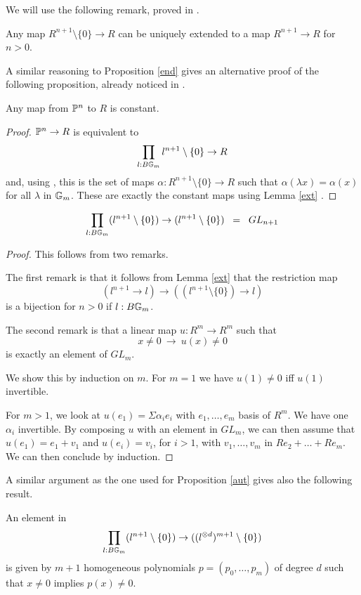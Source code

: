 We will use the following remark, proved in \cite{draft}.

\begin{lemma}\label{ext}
  Any map $R^{n+1}\setminus\{0\}\rightarrow R$ can be uniquely extended to a map $R^{n+1}\rightarrow R$ for $n>0$.
\end{lemma}

A similar reasoning to Proposition \ref{end} gives an alternative proof of the following proposition, already noticed in \cite{draft}.

\begin{proposition}\label{const}
 Any map from $\mathbb{P}^n$ to $R$ is constant.
\end{proposition}

\begin{proof}
  $\mathbb{P}^n\rightarrow R$ is equivalent to
  $$\prod_{l:B\mathbb{G}_m}l^{n+1}\setminus\{0\}\rightarrow R$$
  and, using \cite{Sym}, this is the set of maps $\alpha:R^{n+1}\setminus\{0\}\rightarrow R$
  such that $\alpha(\lambda x) = \alpha(x)$ for all $\lambda$ in $\mathbb{G}_m$. These are exactly the constant maps
  using Lemma \ref{ext} \cite{draft}.
\end{proof}

\begin{proposition}\label{aut}
$$\prod_{l:B\mathbb{G}_m}(l^{n+1}\setminus\{0\})\rightarrow (l^{n+1}\setminus\{0\}) \;\;=\;\; GL_{n+1}$$
\end{proposition}

\begin{proof}
  This follows from two remarks.

  The first remark is that it follows from Lemma \ref{ext} that the restriction map
$$
(l^{n+1}\rightarrow l)\rightarrow ((l^{n+1}\setminus\{0\})\rightarrow l)
$$
is a bijection for $n>0$ if $l:B\mathbb{G}_m$.

\medskip

The second remark is that a linear map $u:R^{m}\rightarrow R^{m}$ such that
$$
x\neq 0~\rightarrow~u(x)\neq 0
$$
is exactly an element of $GL_{m}$.

We show this by induction on $m$. For $m=1$ we have $u(1)\neq 0$ iff $u(1)$ invertible.

For $m>1$, we look at $u(e_1) = \Sigma \alpha_ie_i$ with $e_1,\dots,e_m$ basis of $R^m$.
We have one $\alpha_i$ invertible. By composing $u$ with an element in $GL_m$, we can then
assume that $u(e_1) = e_1+v_1$ and $u(e_i) = v_i$, for $i>1$, with $v_1,\dots,v_m$ in $Re_2+\dots+Re_m$.
We can then conclude by induction.
\end{proof}

 A similar argument as the one used for Proposition \ref{aut} gives also the following result.
 
 \begin{lemma}\label{hom}
   An element in
  $$\prod_{l:B\mathbb{G}_m}(l^{n+1}\setminus\{0\})\rightarrow ((l^{\otimes d})^{m+1}\setminus\{0\})$$
  is given by $m+1$ homogeneous polynomials $p = (p_0,\dots,p_m)$ of degree $d$ such that
  $x\neq 0$ implies $p(x)\neq 0$.
\end{lemma}

